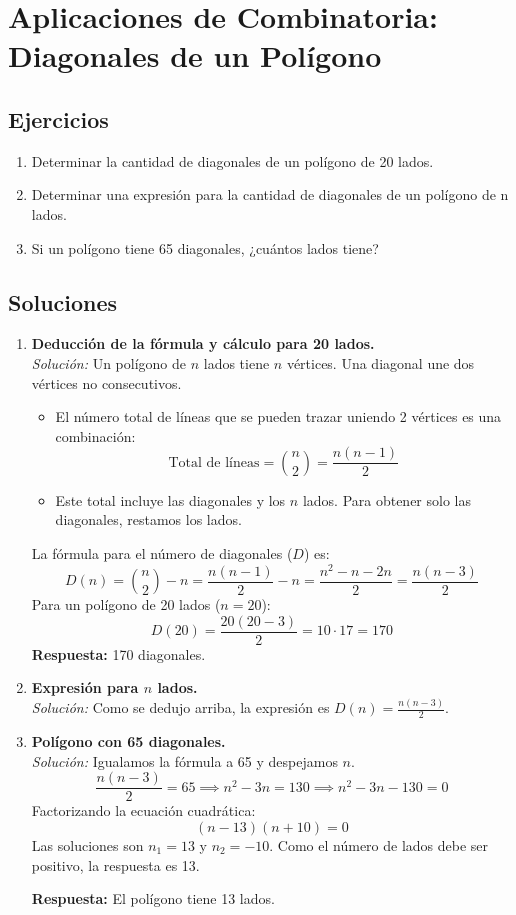 \documentclass[12pt, letterpaper]{article}
\begin{document}
\section{Aplicaciones de Combinatoria: Diagonales de un Polígono}
\subsection{Ejercicios}
\begin{enumerate}
	\item Determinar la cantidad de diagonales de un polígono de 20 lados.
	\item Determinar una expresión para la cantidad de diagonales de un polígono de n lados.
	\item Si un polígono tiene 65 diagonales, ¿cuántos lados tiene?
\end{enumerate}

\subsection{Soluciones}
\begin{enumerate}
	\item \textbf{Deducción de la fórmula y cálculo para 20 lados.} \\
	      \textit{Solución:} Un polígono de $n$ lados tiene $n$ vértices. Una diagonal une dos vértices no consecutivos.
	      \begin{itemize}
		      \item El número total de líneas que se pueden trazar uniendo 2 vértices es una combinación:
		            \[ \text{Total de líneas} = \binom{n}{2} = \frac{n(n-1)}{2} \]
		      \item Este total incluye las diagonales y los $n$ lados. Para obtener solo las diagonales, restamos los lados.
	      \end{itemize}
	      La fórmula para el número de diagonales ($D$) es:
	      \[ D(n) = \binom{n}{2} - n = \frac{n(n-1)}{2} - n = \frac{n^2 - n - 2n}{2} = \frac{n(n-3)}{2} \]
	      Para un polígono de 20 lados ($n=20$):
	      \[ D(20) = \frac{20(20-3)}{2} = 10 \cdot 17 = 170 \]
	      \textbf{Respuesta:} 170 diagonales.

	\item \textbf{Expresión para $n$ lados.} \\
	      \textit{Solución:} Como se dedujo arriba, la expresión es $D(n) = \frac{n(n-3)}{2}$.

	\item \textbf{Polígono con 65 diagonales.} \\
	      \textit{Solución:} Igualamos la fórmula a 65 y despejamos $n$.
	      \[ \frac{n(n-3)}{2} = 65 \implies n^2 - 3n = 130 \implies n^2 - 3n - 130 = 0 \]
	      Factorizando la ecuación cuadrática:
	      \[ (n-13)(n+10) = 0 \]
	      Las soluciones son $n_1 = 13$ y $n_2 = -10$. Como el número de lados debe ser positivo, la respuesta es 13.

	      \textbf{Respuesta:} El polígono tiene 13 lados.
\end{enumerate}
\end{document}

